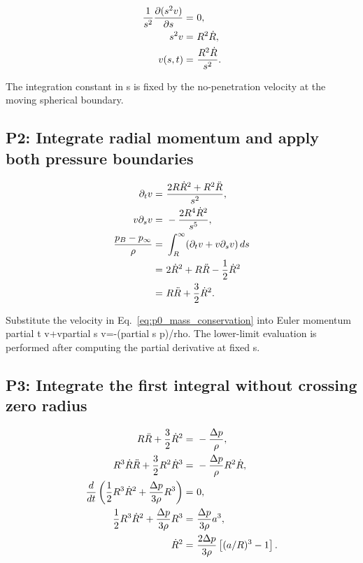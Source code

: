 \documentclass[11pt]{article}
\begin{document}
\begin{align}
\frac{1}{s^2}\frac{\partial(s^2v)}{\partial s}= & ~0, \notag \\
s^2v= & ~R^2\dot R, \notag \\
v(s,t)= & ~\frac{R^2\dot R}{s^2}. \label{eq:p0_mass_conservation}
\end{align}

The integration constant in s is fixed by the no-penetration velocity at the moving spherical boundary.

\subsection{P2: Integrate radial momentum and apply both pressure boundaries}

\begin{align}
\partial_t v= & ~\frac{2R\dot R^2+R^2\ddot R}{s^2}, \notag \\
v\partial_s v= & ~-\frac{2R^4\dot R^2}{s^5}, \notag \\
\frac{p_B-p_\infty}{\rho}= & ~\int_R^\infty(\partial_t v+v\partial_s v)\,ds \notag \\
= & ~2\dot R^2+R\ddot R-\frac12\dot R^2 \notag \\
= & ~R\ddot R+\frac32\dot R^2. \label{eq:p0_radial_momentum}
\end{align}

Substitute the velocity in Eq.~\eqref{eq:p0_mass_conservation} into Euler momentum partial t v+vpartial s v=-(partial s p)/rho. The lower-limit evaluation is performed after computing the partial derivative at fixed s.

\subsection{P3: Integrate the first integral without crossing zero radius}

\begin{align}
R\ddot R+\frac32\dot R^2= & ~-\frac{\Delta p}{\rho}, \notag \\
R^3\dot R\ddot R+\frac32R^2\dot R^3= & ~-\frac{\Delta p}{\rho}R^2\dot R, \notag \\
\frac{d}{dt}\left(\frac12R^3\dot R^2+\frac{\Delta p}{3\rho}R^3\right)= & ~0, \notag \\
\frac12R^3\dot R^2+\frac{\Delta p}{3\rho}R^3= & ~\frac{\Delta p}{3\rho}a^3, \notag \\
\dot R^2= & ~\frac{2\Delta p}{3\rho}\left[(a/R)^3-1\right]. \label{eq:p0_first_integral}
\end{align}
\end{document}
